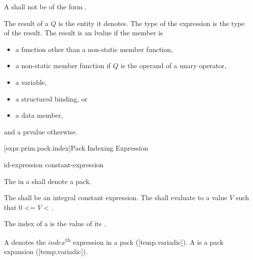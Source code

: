 \documentclass{wg21}
\begin{document}
\pnum
A  shall not be of the form
  \tcode{\~}
 \tcode{::} \tcode{\~} 
.

\pnum
The result of a  $Q$ is
the entity it denotes.
The type of the expression is the type of the result.
The result is an lvalue if the member is
\begin{itemize}
    \item
    a function other than a non-static member function,
    \item
    a non-static member function
    if $Q$ is the operand of a unary \tcode{\&} operator,
    \item
    a variable,
    \item
    a structured binding, or
    \item
    a data member,
\end{itemize}
and a prvalue otherwise.

\begin{addedblock}

[expr.prim.pack.index]{Pack Indexing Expression}

\begin{bnf}
    \br
    id-expression  \terminal{[} constant-expression \terminal{]}  \br
\end{bnf}

The  in a  shall denote a pack.

The  shall be an integral constant expression.
The  shall evaluate to a value $V$ such that 0 <= $V$ < .

The index of a  is the value of its .

A  denotes the ${index}$\textsuperscript{th} expression in a pack ([temp.variadic]).
A  is a pack expansion ([temp.variadic]).

\end{addedblock}
\end{document}
